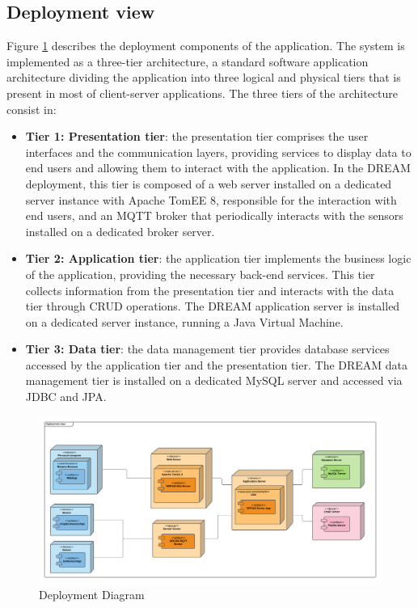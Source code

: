 \documentclass[10pt]{article} %
\begin{document}
\subsection{Deployment view}
Figure \ref{fig:deployment} describes the deployment components of the application. The system is implemented as a three-tier architecture,
a standard software application architecture dividing the application into three logical and physical tiers that is present in most of client-server applications.
The three tiers of the architecture consist in:
\begin{itemize}
    \item \textbf{Tier 1: Presentation tier}: the presentation tier comprises the user interfaces and the communication layers, providing services to display data to end users and allowing
        them to interact with the application. In the DREAM deployment, this tier is composed of a web server installed on a dedicated server instance with Apache TomEE 8, responsible for the interaction with end users, and an MQTT broker that periodically 
        interacts with the sensors installed on a dedicated broker server.
    \item \textbf{Tier 2: Application tier}: the application tier implements the business logic of the application, providing the necessary back-end services.
        This tier collects information from the presentation tier and interacts with the data tier through CRUD operations. The DREAM application server is installed on a dedicated 
        server instance, running a Java Virtual Machine.
    \item \textbf{Tier 3: Data tier}: the data management tier provides database services accessed by the application tier and the presentation tier. The DREAM data management tier is installed on a dedicated
        MySQL server and accessed via JDBC and JPA.
\end{itemize}
\begin{figure}[b!]
    \centering
    \centerline{\includegraphics[scale=0.093]{images/deployment.png}}
    \caption{Deployment Diagram}
    \label{fig:deployment}
\end{figure}
\newpage
\end{document}

